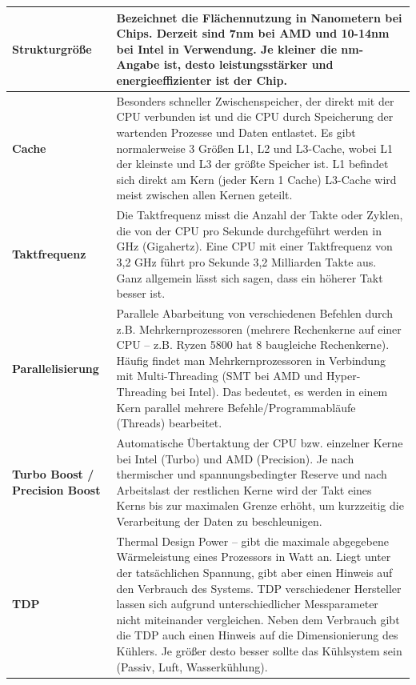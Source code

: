 \documentclass[10pt]{article}
\begin{document}
\begin{flushleft}
\begin{longtable}{|p{}|p{}|}
        \\\hline

        \textbf{Strukturgröße} & Bezeichnet die Flächennutzung in Nanometern bei Chips. Derzeit sind 7nm bei AMD und 10-14nm bei Intel in Verwendung. Je kleiner die nm-Angabe ist, desto leistungsstärker und energieeffizienter ist der Chip.

        \\\hline

        \textbf{Cache} & Besonders schneller Zwischenspeicher, der direkt mit der CPU verbunden ist und die CPU durch Speicherung der wartenden Prozesse und Daten entlastet. Es gibt normalerweise 3 Größen L1, L2 und L3-Cache, wobei L1 der kleinste und L3 der größte Speicher ist. L1 befindet sich direkt am Kern (jeder Kern 1 Cache) L3-Cache wird meist zwischen allen Kernen geteilt.

        \\\hline

        \textbf{Taktfrequenz} & Die Taktfrequenz misst die Anzahl der Takte oder Zyklen, die von der CPU pro Sekunde durchgeführt werden in GHz (Gigahertz). Eine CPU mit einer Taktfrequenz von 3,2 GHz führt pro Sekunde 3,2 Milliarden Takte aus. Ganz allgemein lässt sich sagen, dass ein höherer Takt besser ist.

        \\\hline

        \textbf{Parallelisierung} & Parallele Abarbeitung von verschiedenen Befehlen durch z.B. Mehrkernprozessoren (mehrere Rechenkerne auf einer CPU – z.B. Ryzen 5800 hat 8 baugleiche Rechenkerne). Häufig findet man Mehrkernprozessoren in Verbindung mit Multi-Threading (SMT bei AMD und Hyper-Threading bei Intel). Das bedeutet, es werden in einem Kern parallel mehrere Befehle/Programmabläufe (Threads) bearbeitet.

        \\\hline

        \textbf{Turbo Boost / Precision Boost} & Automatische Übertaktung der CPU bzw. einzelner Kerne bei Intel (Turbo) und AMD (Precision). Je nach thermischer und spannungsbedingter Reserve und nach Arbeitslast der restlichen Kerne wird der Takt eines Kerns bis zur maximalen Grenze erhöht, um kurzzeitig die Verarbeitung der Daten zu beschleunigen.

        \\\hline

        \textbf{TDP} & Thermal Design Power – gibt die maximale abgegebene Wärmeleistung eines Prozessors in Watt an. Liegt unter der tatsächlichen Spannung, gibt aber einen Hinweis auf den Verbrauch des Systems. TDP verschiedener Hersteller lassen sich aufgrund unterschiedlicher Messparameter nicht miteinander vergleichen. Neben dem Verbrauch gibt die TDP auch einen Hinweis auf die Dimensionierung des Kühlers. Je größer desto besser sollte das Kühlsystem sein (Passiv, Luft, Wasserkühlung).


\end{longtable}
\end{flushleft}
\end{document}
